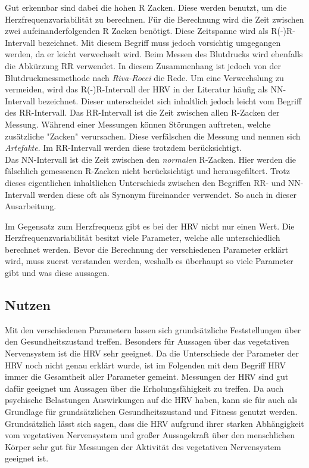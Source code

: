 Gut erkennbar sind dabei die hohen R Zacken. Diese werden benutzt, um die Herzfrequenzvariabilität zu berechnen.
 Für die Berechnung wird die Zeit zwischen zwei aufeinanderfolgenden R Zacken benötigt. Diese Zeitspanne wird als R(-)R-Intervall bezeichnet. Mit diesem Begriff muss jedoch vorsichtig umgegangen werden, da er leicht verwechselt wird. Beim Messen des Blutdrucks wird ebenfalls die Abkürzung RR verwendet. In diesem Zusammenhang ist jedoch von der Blutdruckmessmethode nach \textit{Riva-Rocci} die Rede. Um eine Verwechslung zu vermeiden, wird das R(-)R-Intervall der HRV in der Literatur häufig als NN-Intervall bezeichnet. Dieser unterscheidet sich inhaltlich jedoch leicht vom Begriff des RR-Intervall. 
 Das RR-Intervall ist die Zeit zwischen allen R-Zacken der Messung. Während einer Messungen können Störungen auftreten, welche zusätzliche "Zacken" verursachen. Diese verfälschen die Messung und nennen sich \textit{Artefakte}\cite{artefakt}. Im RR-Intervall werden diese trotzdem berücksichtigt.\\
 Das NN-Intervall ist die Zeit zwischen den \textit{normalen} R-Zacken. Hier werden die fälschlich gemessenen R-Zacken nicht berücksichtigt und herausgefiltert. Trotz dieses eigentlichen inhaltlichen Unterschieds zwischen den Begriffen RR- und NN-Intervall werden diese oft als Synonym füreinander verwendet. So auch in dieser Ausarbeitung.\cite{rr}\cite{kubios}
 

 Im Gegensatz zum Herzfrequenz gibt es bei der HRV nicht nur einen Wert. Die Herzfrequenzvariabilität besitzt viele Parameter, welche alle unterschiedlich berechnet werden. Bevor die Berechnung der verschiedenen Parameter erklärt wird, muss zuerst verstanden werden, weshalb es überhaupt so viele Parameter gibt und was diese aussagen.
 
 \subsection{Nutzen}
 Mit den verschiedenen Parametern lassen sich grundsätzliche Feststellungen über den Gesundheitszustand treffen. Besonders für Aussagen über das vegetativen Nervensystem ist die HRV sehr geeignet. Da die Unterschiede der Parameter der HRV noch nicht genau erklärt wurde, ist im Folgenden mit dem Begriff HRV immer die Gesamtheit aller Parameter gemeint. Messungen der HRV sind gut dafür geeignet um Aussagen über die Erholungsfähigkeit zu treffen. Da auch psychische Belastungen Auswirkungen auf die HRV haben, kann sie für auch als Grundlage für grundsätzlichen Gesundheitszustand und Fitness genutzt werden. \\
Grundsätzlich lässt sich sagen, dass die HRV aufgrund ihrer starken Abhängigkeit vom vegetativen Nervensystem und großer Aussagekraft über den menschlichen Körper sehr gut für Messungen der Aktivität des vegetativen Nervensystem geeignet ist. 
 

